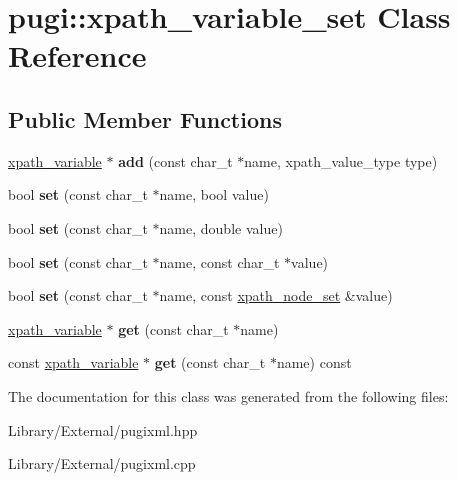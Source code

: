 \hypertarget{classpugi_1_1xpath__variable__set}{}\section{pugi\+:\+:xpath\+\_\+variable\+\_\+set Class Reference}
\label{classpugi_1_1xpath__variable__set}
\subsection*{Public Member Functions}
\begin{DoxyCompactItemize}
\item 
\hypertarget{classpugi_1_1xpath__variable__set_a07051524f1c6a54bf8f16c9506d6ed5e}{}\hyperlink{classpugi_1_1xpath__variable}{xpath\+\_\+variable} $\ast$ {\bfseries add} (const char\+\_\+t $\ast$name, xpath\+\_\+value\+\_\+type type)\label{classpugi_1_1xpath__variable__set_a07051524f1c6a54bf8f16c9506d6ed5e}

\item 
\hypertarget{classpugi_1_1xpath__variable__set_a461660115640e623fe53af3d9f6b7a05}{}bool {\bfseries set} (const char\+\_\+t $\ast$name, bool value)\label{classpugi_1_1xpath__variable__set_a461660115640e623fe53af3d9f6b7a05}

\item 
\hypertarget{classpugi_1_1xpath__variable__set_a74c45684cc9b790601830f5c51bb8b89}{}bool {\bfseries set} (const char\+\_\+t $\ast$name, double value)\label{classpugi_1_1xpath__variable__set_a74c45684cc9b790601830f5c51bb8b89}

\item 
\hypertarget{classpugi_1_1xpath__variable__set_a6c97731437c5aa4d57b72185ee03451c}{}bool {\bfseries set} (const char\+\_\+t $\ast$name, const char\+\_\+t $\ast$value)\label{classpugi_1_1xpath__variable__set_a6c97731437c5aa4d57b72185ee03451c}

\item 
\hypertarget{classpugi_1_1xpath__variable__set_a5835902a2662631836cc6457709b84ec}{}bool {\bfseries set} (const char\+\_\+t $\ast$name, const \hyperlink{classpugi_1_1xpath__node__set}{xpath\+\_\+node\+\_\+set} \&value)\label{classpugi_1_1xpath__variable__set_a5835902a2662631836cc6457709b84ec}

\item 
\hypertarget{classpugi_1_1xpath__variable__set_aca5af5d65cdf0f639890cc1d3caec610}{}\hyperlink{classpugi_1_1xpath__variable}{xpath\+\_\+variable} $\ast$ {\bfseries get} (const char\+\_\+t $\ast$name)\label{classpugi_1_1xpath__variable__set_aca5af5d65cdf0f639890cc1d3caec610}

\item 
\hypertarget{classpugi_1_1xpath__variable__set_a6a15d76060162ae19f7c175af0c15cc3}{}const \hyperlink{classpugi_1_1xpath__variable}{xpath\+\_\+variable} $\ast$ {\bfseries get} (const char\+\_\+t $\ast$name) const \label{classpugi_1_1xpath__variable__set_a6a15d76060162ae19f7c175af0c15cc3}

\end{DoxyCompactItemize}


The documentation for this class was generated from the following files\+:\begin{DoxyCompactItemize}
\item 
Library/\+External/pugixml.\+hpp\item 
Library/\+External/pugixml.\+cpp\end{DoxyCompactItemize}
